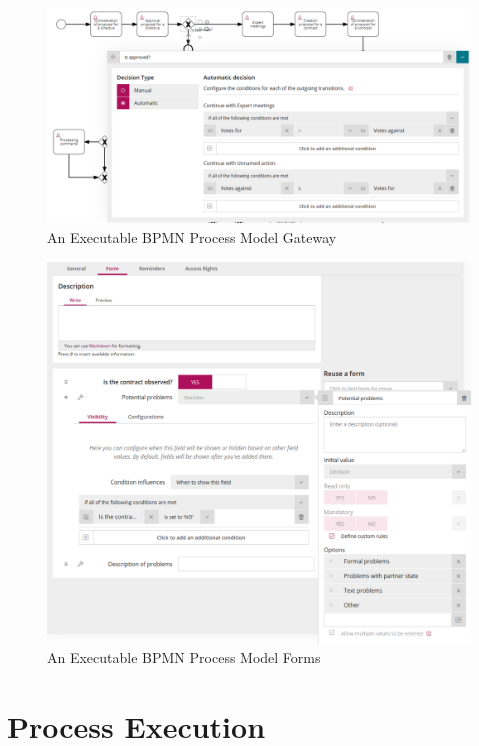 \begin{figure}[h]\centering
	\includegraphics[width=\textwidth]{pic/BPMNDecision}
	\caption{An Executable BPMN Process Model Gateway~\cite{kutisvlk2019}}
	\label{fig:bpmnDecision}
\end{figure}

\begin{figure}[h]\centering
	\includegraphics[width=\textwidth]{pic/BPMNForm}
	\caption{An Executable BPMN Process Model Forms~\cite{kutisvlk2019}}
	\label{fig:bpmnForm}
\end{figure}

\section{Process Execution}

